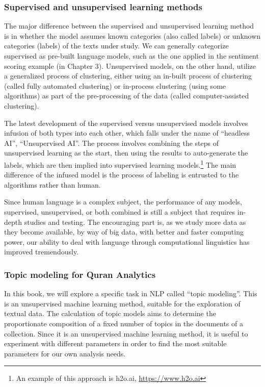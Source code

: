 \documentclass[
]{article}
\begin{document}
\hypertarget{supervised-and-unsupervised-learning-methods}{%
\subsubsection{Supervised and unsupervised learning methods}\label{supervised-and-unsupervised-learning-methods}}

The major difference between the supervised and unsupervised learning method is in whether the model assumes known categories (also called labels) or unknown categories (labels) of the texts under study. We can generally categorize supervised as pre-built language models, such as the one applied in the sentiment scoring example (in Chapter 3). Unsupervised models, on the other hand, utilize a generalized process of clustering, either using an in-built process of clustering (called fully automated clustering) or in-process clustering (using some algorithms) as part of the pre-processing of the data (called computer-assisted clustering).

The latest development of the supervised versus unsupervised models involves infusion of both types into each other, which falls under the name of ``headless AI'', ``Unsupervised AI''. The process involves combining the steps of unsupervised learning as the start, then using the results to auto-generate the labels, which are then implied into supervised learning models.\footnote{An example of this approach is h2o.ai, \url{https://www.h2o.ai}} The main difference of the infused model is the process of labeling is entrusted to the algorithms rather than human.

Since human language is a complex subject, the performance of any models, supervised, unsupervised, or both combined is still a subject that requires in-depth studies and testing. The encouraging part is, as we study more data as they become available, by way of big data, with better and faster computing power, our ability to deal with language through computational linguistics has improved tremendously.

\hypertarget{topic-modeling-for-quran-analytics}{%
\subsubsection{Topic modeling for Quran Analytics}\label{topic-modeling-for-quran-analytics}}

In this book, we will explore a specific task in NLP called ``topic modeling''. This is an unsupervised machine learning method, suitable for the exploration of textual data. The calculation of topic models aims to determine the proportionate composition of a fixed number of topics in the documents of a collection. Since it is an unsupervised machine learning method, it is useful to experiment with different parameters in order to find the most suitable parameters for our own analysis needs.
\end{document}
